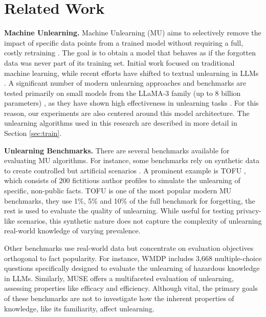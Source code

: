 \section{Related Work}
\label{sec:rw}

\textbf{Machine Unlearning.}
Machine Unlearning (MU) aims to selectively remove the impact of specific data points from a trained model without requiring a full, costly retraining \cite{mantelero2013eu, cao2015towards, sekhari2021remember}. The goal is to obtain a model that behaves as if the forgotten data was never part of its training set. Initial work focused on traditional machine learning, while recent efforts have shifted to textual unlearning in LLMs \cite{sekhari2021remember, kurmanji2023towards}.
A significant number of modern unlearning approaches and benchmarks are tested primarily on small models from the LLaMA-3 family (up to 8 billion parameters) \cite{yuan2025towards, maini2024tofu, wang2025selective, si2023knowledge}, as they have shown high effectiveness in unlearning tasks \cite{maini2024tofu, yuan2025towards}. For this reason, our experiments are also centered around this model architecture.
The unlearning algorithms used in this research are described in more detail in Section \ref{sec:train}.

\textbf{Unlearning Benchmarks.}
There are several benchmarks available for evaluating MU algorithms. For instance, some benchmarks rely on synthetic data to create controlled but artificial scenarios \cite{geng2025comprehensive, hu2024unlearning, si2023knowledge}. A prominent example is TOFU \cite{maini2024tofu}, which consists of 200 fictitious author profiles to simulate the unlearning of specific, non-public facts. TOFU is one of the most popular modern MU benchmarks, they use 1\%, 5\% and 10\% of the full benchmark for forgetting, the rest is used to evaluate the quality of unlearning. While useful for testing privacy-like scenarios, this synthetic nature does not capture the complexity of unlearning real-world knowledge of varying prevalence.

Other benchmarks use real-world data but concentrate on evaluation objectives orthogonal to fact popularity. For instance, WMDP \cite{li2024wmdp} includes 3,668 multiple-choice questions specifically designed to evaluate the unlearning of hazardous knowledge in LLMs. Similarly, MUSE \cite{shimuse} offers a multifaceted evaluation of unlearning, assessing properties like efficacy and efficiency. Although vital, the primary goals of these benchmarks are not to investigate how the inherent properties of knowledge, like its familiarity, affect unlearning.

